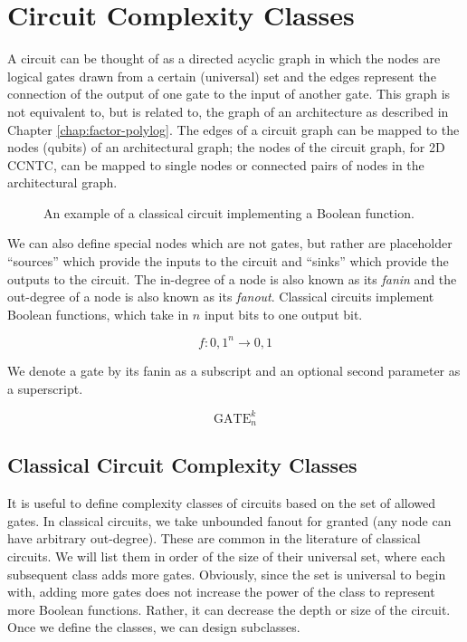 \section{Circuit Complexity Classes}
\label{sec:fsl-circuits}

A circuit can be thought of as a directed acyclic graph in which the nodes are
logical gates drawn from a certain (universal) set and the edges 
represent
the connection of the output of one gate to the input of another
gate. This graph is not equivalent to, but is related to, the graph of an architecture
as described in Chapter \ref{chap:factor-polylog}. The edges of a circuit graph can
be mapped to the nodes (qubits) of an architectural graph; the nodes of the
circuit graph, for 2D CCNTC, can be mapped to single nodes or connected pairs of nodes
in the architectural graph.

\begin{figure}
\caption{An example of a classical circuit implementing a Boolean function.}
\end{figure}

We can also define special nodes which are not gates, but rather
are placeholder ``sources'' which provide the inputs to the circuit and 
``sinks'' which provide the outputs to the circuit. The in-degree of a 
node is also known as its \emph{fanin} and the out-degree of a node is
also known as its \emph{fanout}.
Classical circuits implement Boolean functions, which take in $n$ input
bits to one output bit.

\begin{equation}
f:{0,1}^n \rightarrow {0,1}
\end{equation}

We denote a gate by its fanin as a subscript and an optional
second parameter as a superscript.

\begin{equation}
\text{GATE}_n^k
\end{equation}

\subsection{Classical Circuit Complexity Classes}

It is useful to define complexity classes of circuits based on the
set of allowed gates. In classical circuits, we take unbounded fanout
for granted (any node can have arbitrary out-degree). These are common
in the literature of classical circuits. We will list them in order
of the size of their universal set, where each subsequent class adds
more gates.
Obviously, since the set is universal to begin with, adding more gates
does not increase the power of the class to represent more Boolean
functions. Rather, it can decrease the depth or size of the circuit.
Once we define the classes, we can design subclasses.

